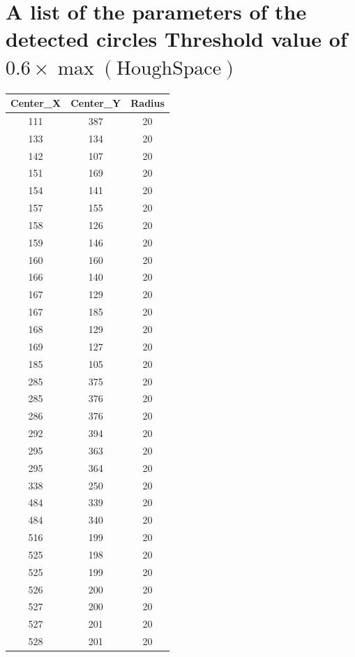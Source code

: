 \documentclass[12pt]{article}
\begin{document}
\part{A list of the parameters of the detected circles Threshold value of $0.6 \times \max(\text{HoughSpace})$ }

\cleardoublepage



\begin{tabular}{|c|c|c|}
	
	\hline
	Center\_X & Center\_Y & Radius \\
	\hline
	111 & 387 &20 \\
	\hline
	133& 134& 20 \\
	\hline
	142& 107& 20 \\
	\hline
	151& 169& 20 \\
	\hline
	154& 141& 20 \\
	\hline
	157& 155& 20 \\
	\hline
	158& 126& 20 \\
	\hline
	159& 146& 20 \\
	\hline
	160& 160& 20 \\
	\hline
	166& 140& 20 \\
	\hline
	167& 129& 20 \\
	\hline
	167& 185& 20 \\
	\hline
	168& 129& 20 \\
	\hline
	169& 127& 20 \\
	\hline
	185& 105& 20 \\
	\hline
	285& 375& 20 \\
	\hline
	285& 376&20 \\
	\hline
	286& 376& 20 \\
	\hline
	292& 394& 20 \\
	\hline
	295& 363&20 \\
	\hline
	295& 364& 20 \\
	\hline
	338& 250& 20 \\
	\hline
	484& 339& 20 \\
	\hline
	484& 340& 20 \\
	\hline
	516& 199& 20 \\
	\hline
	525& 198& 20 \\
	\hline
	525& 199& 20 \\
	\hline
	526& 200& 20 \\
	\hline
	527& 200& 20 \\
	\hline
	527& 201& 20 \\
	\hline
	528& 201& 20 \\

\end{tabular}
\end{document}
